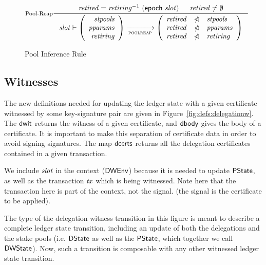 \begin{figure}
  \begin{equation}\label{eq:pool-reap}
    \inference[Pool-Reap]
    {
      \var{retired} = \var{retiring}^{-1}~\var{(\epoch{slot})}
      & \var{retired} \neq \emptyset
    }
    {
      \var{slot} \vdash
      \left(
      \begin{array}{r}
        \var{stpools} \\
        \var{pparams} \\
        \var{retiring}
      \end{array}
      \right)
      \trans{poolreap}{}
      \left(
      \begin{array}{rcl}
        \var{retired} & \subtractdom & \var{stpools} \\
        \var{retired} & \subtractdom & \var{pparams} \\
        \var{retired} & \subtractdom & \var{retiring} \\
      \end{array}
      \right)
    }
  \end{equation}
  \caption{Pool Inference Rule}
  \label{fig:pool-rules}

\end{figure}

\subsection{Witnesses}
\label{sec:delegation-witnesses}


The new definitions needed for updating the ledger state with a given
certificate witnessed by some key-signature pair
are given in Figure~\ref{fig:defs:delegationw}. The $\mathsf{dwit}$ returns
the witness of a given certificate, and $\mathsf{dbody}$ gives the body of a
certificate. It is important to make this separation of certificate data
in order to avoid signing signatures. The map $\mathsf{dcerts}$ returns all
the delegation certificates contained in a given transaction.

We include $\mathit{slot}$ in the context ($\mathsf{DWEnv}$) because it is needed to update
$\mathsf{PState}$, as well as the transaction $\mathit{tx}$ which is being witnessed.
Note here that the transaction here is part of the context, not the signal.
(the signal is the certificate to be applied).

The type of the delegation witness
transition in this figure is meant to describe a complete ledger state
transition, including an update of both the delegations and the stake pools
(i.e. $\mathsf{DState}$ as well as the $\mathsf{PState}$, which together we call $\mathsf{DWState}$).
Now, such a transition is
composable with any other witnessed ledger state transition.


